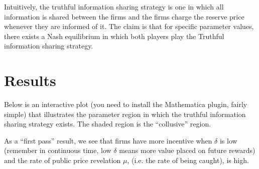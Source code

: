\documentclass{article}
\begin{document}
Intuitively, the truthful information sharing strategy is one in which
all information is shared between the firms and the firms charge the
reserve price whenever they are informed of it.  The claim is that for
specific parameter values, there exists a Nash equilibrium in which
both players play the Truthful information sharing strategy.  

\section{Results}
Below is an interactive plot (you need to install the Mathematica
plugin, fairly simple) that illustrates the parameter region in which
the truthful information sharing strategy exists.  The shaded region
is the ``collusive'' region.


As a ``first pass'' result, we see that firms have more incentive when
$\delta$ is low (remember in continuous time, low $\delta$ means more
value placed on future rewards) and the rate of public price
revelation $\mu$, (i.e. the rate of being caught), is high.







\end{document}
